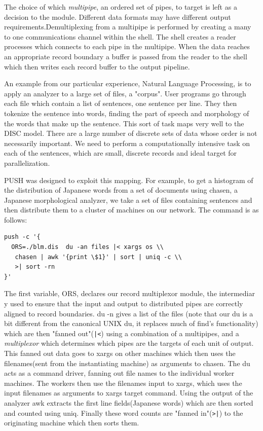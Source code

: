 The choice of which \emph{multipipe}, an ordered set of pipes, to target is
left as a decision to the module.
Different data formats may have different output requirements.Demultiplexing from a multipipe is performed by creating a many to one
communications channel within the shell. The shell creates a reader processes
which connects to each pipe in the multipipe. When the data reaches an
appropriate record boundary a buffer is passed from the reader to the shell
which then writes each record buffer to the output pipeline.

An example from our particular experience, Natural Language Processing, is
to apply an analyzer to a large set of files, a "corpus". User programs go
through each file which contain a list of sentences, one sentence per line.
They then tokenize the sentence into words, finding the part of speech and
morphology of the words that make up the sentence.
This sort of task maps very well to the DISC model. There are a large number of
discrete sets of data whose order is not necessarily important. We need to
perform a computationally intensive task on each of the sentences, which are
small, discrete records and ideal target for parallelization.

PUSH was designed to exploit this mapping. For example, to get a histogram of
the distribution of Japanese words from a set of documents using chasen,
a Japanese morphological analyzer, we take a set of files containing sentences
and then distribute them to a cluster of machines on our network. The command
is as follows:
\begin{verbatim}
push -c '{
  ORS=./blm.dis  du -an files |< xargs os \\
   chasen | awk '{print \$1}' | sort | uniq -c \\
   >| sort -rn
}'
\end{verbatim}

The first variable, ORS, declares our record multiplexor module, the intermediar
y
used to ensure that the input and output to distributed pipes are correctly
aligned to record boundaries. du -n gives a list of the files (note that our
du is a bit different from the canonical UNIX du, it replaces much of find's
functionality) which are then "fanned out"(\verb!|<!) using a combination
of a multipipes, and a \emph{multiplexor}
which determines which pipes are the targets of each unit of output.
This fanned out data goes to xargs on other machines which
then uses the filenames(sent from the instantiating machine) as arguments to
chasen. The du acts as a command driver, fanning out file names to the
individual worker machines. The workers then use the filenames input to
xargs, which uses the input filenames as arguments to xargs target command.
Using the output of the analyzer awk extracts the first line fields(Japanese
words) which are then sorted and counted using uniq.  Finally these word
counts are "fanned in"(\verb!>|!) to the originating machine which then
sorts them.


